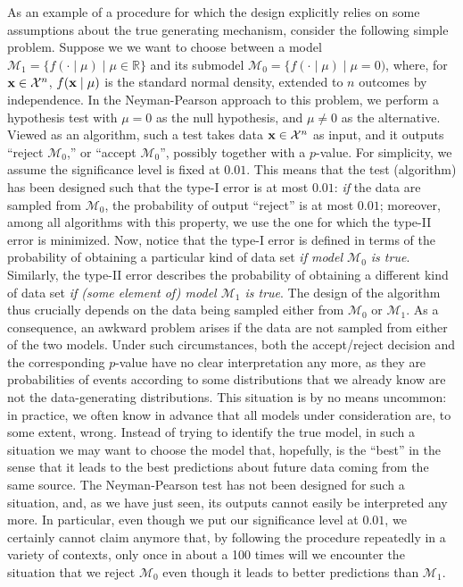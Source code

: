 \documentclass[authoryear]{elsarticle}
\newcommand{\model}{\mathcal{M}}
\begin{document}
 As an example of a procedure for which the design explicitly relies
 on some
 assumptions about the true generating mechanism,
 consider the following simple problem. Suppose we
 we want to choose between a model $\model_1 = \{
  f(\cdot \mid \mu) \mid \mu \in {\mathbb R} \}$ and its submodel
  $\model_0 = \{ f(\cdot \mid \mu) \mid \mu = 0)$, where, for ${\bf x}
  \in {\cal X}^n$, $f({\bf x} \mid \mu)$ is the standard normal
  density, extended to $n$ outcomes by independence.
  In the
  Neyman-Pearson approach to this problem, we perform a hypothesis
  test with $\mu=0$ as the null hypothesis, and $\mu \neq 0$ as the
  alternative. Viewed as an algorithm, such a test takes data ${\bf x}
  \in {\cal X}^n$ as input, and it outputs ``reject $\model_0$,'' or
  ``accept $\model_0$'', possibly together with a $p$-value. For
  simplicity, we assume the significance level is fixed at $0.01$.
  This means that the  test (algorithm) has been designed such
  that the type-I error is at
  most $0.01$: {\em if\/} the data are sampled from $\model_0$,
  the probability of output ``reject'' is at most $0.01$; moreover,
  among all algorithms with this property, we use the one for
  which the type-II error is minimized. Now, notice that the
  type-I error is defined in terms of the probability of obtaining a
  particular kind of data set  {\em if model $\model_0$ is true}.
  Similarly, the type-II error describes the probability of obtaining a
  different kind of data set {\em if (some element of) model $\model_1$
    is true}.  The design of the algorithm thus crucially
  depends on the data being sampled either from $\model_0$ or
  $\model_1$. As a consequence, an awkward problem arises if
  the data are not sampled from either of the two models. Under
  such circumstances, both
  the accept/reject decision and the corresponding $p$-value have
    no clear interpretation any more, as they are probabilities of
  events according to some distributions that we already know are not
  the data-generating distributions.
  This situation is by no means uncommon:
  in practice, we often know in advance that all models under
consideration are, to some extent, wrong. Instead of trying to
identify the true model, in such a situation we may
want to choose the model that, hopefully, is the ``best'' in the sense
that it leads to the best predictions about future data coming from the
same source.
The Neyman-Pearson test has
not been designed for such a situation, and, as we have just seen, its
outputs cannot easily be interpreted any more.
In particular, even though we put
  our significance level at $0.01$, we certainly cannot claim anymore
  that, by following the procedure repeatedly in a variety of
  contexts, only once in  about a 100 times will
  we encounter the situation that we
reject $\model_0$ even though it leads to better predictions than $\model_1$.
\end{document}
